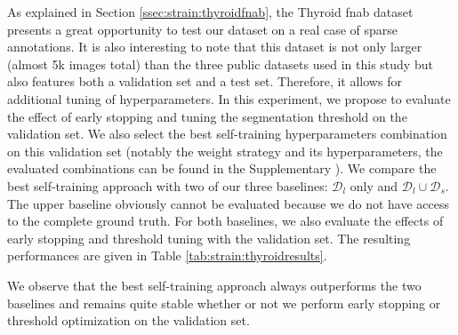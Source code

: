 As explained in Section \ref{ssec:strain:thyroidfnab}, the Thyroid \acrshort{fnab} dataset presents a great opportunity to test our dataset on a real case of sparse annotations. It is also interesting to note that this dataset is not only larger (almost 5k images total) than the three public datasets used in this study but also features both a validation set and a test set. Therefore, it allows for additional tuning of hyperparameters. In this experiment, we propose to evaluate the effect of early stopping and tuning the segmentation threshold on the validation set. We also select the best self-training hyperparameters combination on this validation set (\ie notably the weight strategy and its hyperparameters, the evaluated combinations can be found in the Supplementary ). We compare the best self-training approach with two of our three baselines: $\mathcal{D}_l$ only and $\mathcal{D}_l \cup \mathcal{D}_s$. The upper baseline obviously cannot be evaluated because we do not have access to the complete ground truth. For both baselines, we also evaluate the effects of early stopping and threshold tuning with the validation set. The resulting performances are given in Table \ref{tab:strain:thyroidresults}.


We observe that the best self-training approach always outperforms the two baselines and remains quite stable whether or not we perform early stopping or threshold optimization on the validation set. 

